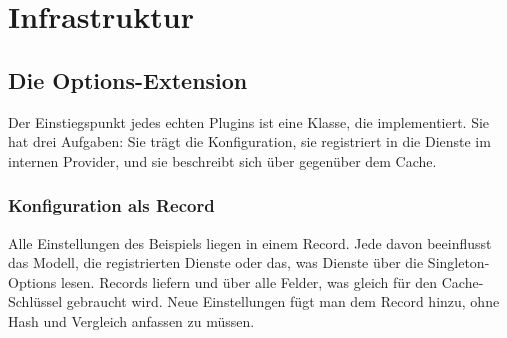\part{Infrastruktur}\label{part:infrastructure}

\chapter{Die Options-Extension}\label{ch:the-options-extension}

Der Einstiegspunkt jedes echten Plugins ist eine Klasse, die
 implementiert. Sie
hat drei Aufgaben: Sie trägt die Konfiguration, sie registriert in
 die Dienste im internen Provider, und sie beschreibt sich
über  gegenüber dem Cache.

\section{Konfiguration als Record}

Alle Einstellungen des Beispiels liegen in einem Record. Jede davon beeinflusst das Modell,
die registrierten Dienste oder das, was Dienste über die Singleton-Options lesen. Records liefern
 und  über alle Felder, was gleich
für den Cache-Schlüssel gebraucht wird. Neue Einstellungen fügt man dem Record hinzu, ohne
Hash und Vergleich anfassen zu müssen.

